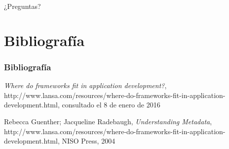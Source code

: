 \documentclass{beamer}
\begin{document}

\begin{frame}
\Huge{\centerline{¿Preguntas?}}
\end{frame}



\section{Bibliografía}

\begin{frame}
        \frametitle{Bibliografía}        
        \begin{thebibliography}{99}

  			\emph{Where do frameworks fit in application development?},
  			http://www.lansa.com/resources/where-do-frameworks-fit-in-application-development.html,
  			consultado el 8 de enero de 2016
  			
    			Rebecca Guenther; Jacqueline Radebaugh,
  			\emph{Understanding Metadata},
  			http://www.lansa.com/resources/where-do-frameworks-fit-in-application-development.html,
  			NISO Press, 2004
  			



		\end{thebibliography}
\end{frame}
\end{document}
